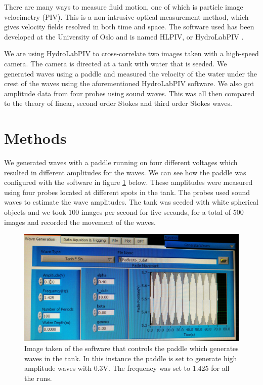 \documentclass[english,a4paper,12pt]{article}
\begin{document}
There are many ways to measure fluid motion, one of which is particle image velocimetry (PIV). This is a non-intrusive optical measurement method, which gives velocity fields resolved in both time and space. The software used has been developed at the University of Oslo and is named HLPIV, or HydroLabPIV \cite{HLPIV}. \\ \bigskip 

We are using HydroLabPIV to cross-correlate two images taken with a high-speed camera. The camera is directed at a tank with water that is seeded. We generated waves using a paddle and measured the velocity of the water under the crest of the waves using the aforementioned HydroLabPIV software. We also got amplitude data from four probes using sound waves. This was all then compared to the theory of linear, second order Stokes and third order Stokes waves.


\section*{Methods}

We generated waves with a paddle running on four different voltages which resulted in different amplitudes for the waves. We can see how the paddle was configured with the software in figure \ref{fig:1} below. These amplitudes were measured using four probes located at different spots in the tank. The probes used sound waves to estimate the wave amplitudes. The tank was seeded with white spherical objects and we took $100$ images per second for five seconds, for a total of $500$ images and recorded the movement of the waves. \\ \bigskip

\begin{figure}[H]
    \centering
    \includegraphics[width=120mm]{wave_maker11.jpg}
    \caption{Image taken of the software that controls the paddle which generates waves in the tank. In this instance the paddle is set to generate high amplitude waves with 0.3V. The frequency was set to 1.425 for all the runs.}
    \label{fig:1}
\end{figure}
\end{document}
